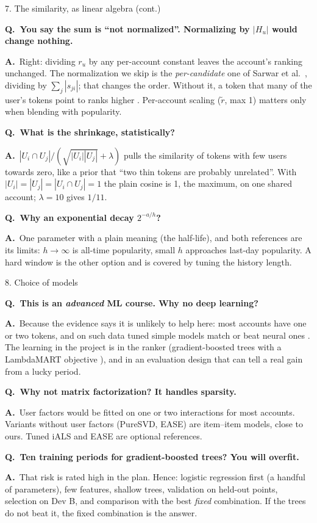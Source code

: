 \documentclass[aspectratio=169,10pt]{beamer}
\newcommand{\Q}[1]{\par{\color{orange}\bfseries Q.\ #1}\par\smallskip}
\newcommand{\A}{{\color{teal}\bfseries A.}\ }
\newcommand{\toindex}{\hfill\hyperlink{index}{\beamerreturnbutton{index}}}
\newcommand{\qsep}{\par\medskip{\color{grey!40}\hrule}\medskip}
\begin{document}
\begin{frame}{7. The similarity, as linear algebra (cont.) \toindex}
  \footnotesize
  \Q{You say the sum is ``not normalized''. Normalizing by $|H_u|$ would change nothing.}
  \A Right: dividing $r_u$ by any per-account constant leaves the account's ranking unchanged. The normalization we skip is the \emph{per-candidate} one of Sarwar et al.\ \cite{sarwar2001}, dividing by $\sum_j |s_{ji}|$; that changes the order. Without it, a token that many of the user's tokens point to ranks higher \cite{cremonesi2010}. Per-account scaling ($\tilde r$, max 1) matters only when blending with popularity.
  \qsep
  \Q{What is the shrinkage, statistically?}
  \A $|U_i\cap U_j|/(\sqrt{|U_i||U_j|}+\lambda)$ pulls the similarity of tokens with few users towards zero, like a prior that ``two thin tokens are probably unrelated''. With $|U_i|=|U_j|=|U_i\cap U_j|=1$ the plain cosine is 1, the maximum, on one shared account; $\lambda=10$ gives $1/11$.
  \qsep
  \Q{Why an exponential decay $2^{-a/h}$?}
  \A One parameter with a plain meaning (the half-life), and both references are its limits: $h\to\infty$ is all-time popularity, small $h$ approaches last-day popularity. A hard window is the other option and is covered by tuning the history length.
\end{frame}

\begin{frame}[label=qmodel]{8. Choice of models \toindex}
  \footnotesize
  \Q{This is an \emph{advanced} ML course. Why no deep learning?}
  \A Because the evidence says it is unlikely to help here: most accounts have one or two tokens, and on such data tuned simple models match or beat neural ones \cite{dacrema2019,anelli2022,ludewig2018}. The learning in the project is in the ranker (gradient-boosted trees with a LambdaMART objective \cite{burges2010}), and in an evaluation design that can tell a real gain from a lucky period.
  \qsep
  \Q{Why not matrix factorization? It handles sparsity.}
  \A User factors would be fitted on one or two interactions for most accounts. Variants without user factors (PureSVD, EASE) are item--item models, close to ours. Tuned iALS \cite{hu2008,rendle2021} and EASE \cite{steck2019} are optional references.
  \qsep
  \Q{Ten training periods for gradient-boosted trees? You will overfit.}
  \A That risk is rated high in the plan. Hence: logistic regression first (a handful of parameters), few features, shallow trees, validation on held-out points, selection on Dev B, and comparison with the best \emph{fixed} combination. If the trees do not beat it, the fixed combination is the answer.
\end{frame}
\end{document}
